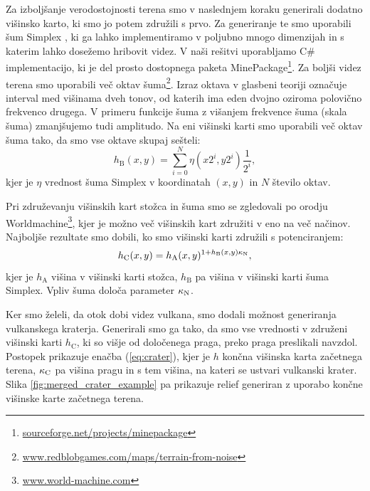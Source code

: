 \documentclass[9pt]{style/friteza}
\begin{document}
Za izboljšanje verodostojnosti terena smo v naslednjem koraku generirali dodatno višinsko karto, ki smo jo potem združili s prvo. Za generiranje te smo uporabili šum Simplex \cite{simplex_noise_01}, ki ga lahko implementiramo v poljubno mnogo dimenzijah in s katerim lahko dosežemo hribovit videz. V naši rešitvi uporabljamo C\# implementacijo, ki je del prosto dostopnega paketa MinePackage\footnote{\href{https://sourceforge.net/projects/minepackage/}{sourceforge.net/projects/minepackage}}. Za boljši videz terena smo uporabili več oktav šuma\footnote{\href{http://www.redblobgames.com/maps/terrain-from-noise/}{www.redblobgames.com/maps/terrain-from-noise}}. Izraz oktava v glasbeni teoriji označuje interval med višinama dveh tonov, od katerih ima eden dvojno oziroma polovično frekvenco drugega. V primeru funkcije šuma z višanjem frekvence šuma (skala šuma) zmanjšujemo tudi amplitudo. Na eni višinski karti smo uporabili več oktav šuma tako, da smo vse oktave skupaj sešteli:
\begin{equation} \label{eq:octaves_simplex}
h_\mathrm{B}(x,y) = \sum_{i=0}^{N} \eta(x 2^i, y 2^i) \frac{1}{2^i},
\end{equation}
kjer je $\eta$ vrednost šuma Simplex v koordinatah $(x,y)$ in $N$ število oktav.

Pri združevanju višinskih kart stožca in šuma smo se zgledovali po orodju Worldmachine\footnote{\href{http://www.world-machine.com/}{www.world-machine.com}}, kjer je možno več višinskih kart združiti v eno na več načinov. Najboljše rezultate smo dobili, ko smo višinski karti združili s potenciranjem:
\begin{equation} \label{eq:map_merge}
h_\mathrm{C}(x,y) = h_\mathrm{A}(x,y)^{1 + h_\mathrm{B}(x,y){\kappa_\mathrm{N}}},
\end{equation}
kjer je $h_\mathrm{A}$ višina v višinski karti stožca, $h_\mathrm{B}$ pa višina v višinski karti šuma Simplex. Vpliv šuma določa parameter ${\kappa_\mathrm{N}}$.

Ker smo želeli, da otok dobi videz vulkana, smo dodali možnost generiranja vulkanskega kraterja. Generirali smo ga tako, da smo vse vrednosti v združeni višinski karti $h_\mathrm{C}$, ki so višje od določenega praga, preko praga preslikali navzdol. Postopek prikazuje enačba (\ref{eq:crater}), kjer je $h$ končna višinska karta začetnega terena, ${\kappa_\mathrm{C}}$ pa višina pragu in s tem višina, na kateri se ustvari vulkanski krater. Slika \ref{fig:merged_crater_example} pa prikazuje relief generiran z uporabo končne višinske karte začetnega terena.
\end{document}
